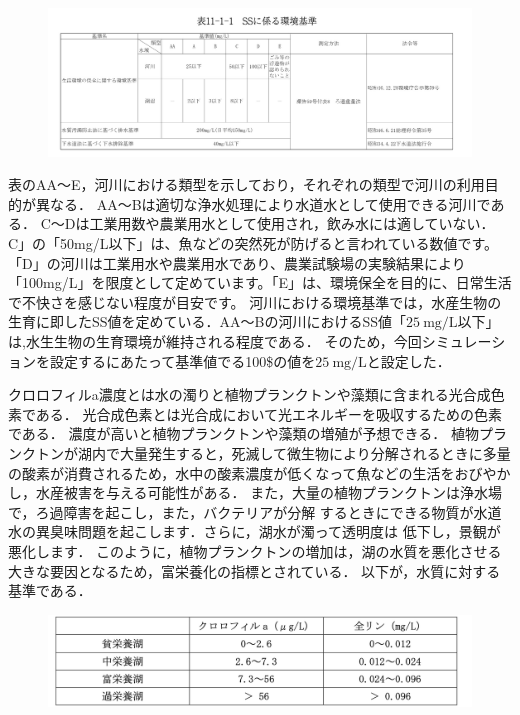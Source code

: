 \documentclass[12pt,a4j,titlepage]{ltjsarticle}
\begin{document}
{{{\begin{figure}[h]
 \begin{center}
   \includegraphics[width=.95\columnwidth]{ss_data.jpg}
 \end{center}
 \end{figure}

\newpage
表のAA～E，河川における類型を示しており，それぞれの類型で河川の利用目的が異なる．
AA～Bは適切な浄水処理により水道水として使用できる河川である．
C～Dは工業用数や農業用水として使用され，飲み水には適していない．
C」の「50mg/L以下」は、魚などの突然死が防げると言われている数値です。「D」の河川は工業用水や農業用水であり、農業試験場の実験結果により「100mg/L」を限度として定めています。「E」は、環境保全を目的に、日常生活で不快さを感じない程度が目安です。
河川における環境基準では，水産生物の生育に即したSS値を定めている．AA～Bの河川におけるSS値「$25\ \text{mg}/\text{L}$以下」は,水生生物の生育環境が維持される程度である．
そのため，今回シミュレーションを設定するにあたって基準値でる100\$の値を$25\ \text{mg}/\text{L}$と設定した．


クロロフィルa濃度とは水の濁りと植物プランクトンや藻類に含まれる光合成色素である．
光合成色素とは光合成において光エネルギーを吸収するための色素である．
濃度が高いと植物プランクトンや藻類の増殖が予想できる．
植物プランクトンが湖内で大量発生すると，死滅して微生物により分解されるときに多量の酸素が消費されるため，水中の酸素濃度が低くなって魚などの生活をおびやかし，水産被害を与える可能性がある．
 また，大量の植物プランクトンは浄水場で，ろ過障害を起こし，また，バクテリアが分解
するときにできる物質が水道水の異臭味問題を起こします．さらに，湖水が濁って透明度は
低下し，景観が悪化します．
このように，植物プランクトンの増加は，湖の水質を悪化させる大きな要因となるため，富栄養化の指標とされている．
以下が，水質に対する基準である．

{\begin{figure}[h]
 \begin{center}
   \includegraphics[width=.95\columnwidth]{chl-a_data.jpg}
 \end{center}
 \end{figure}

}}}}
\end{document}
